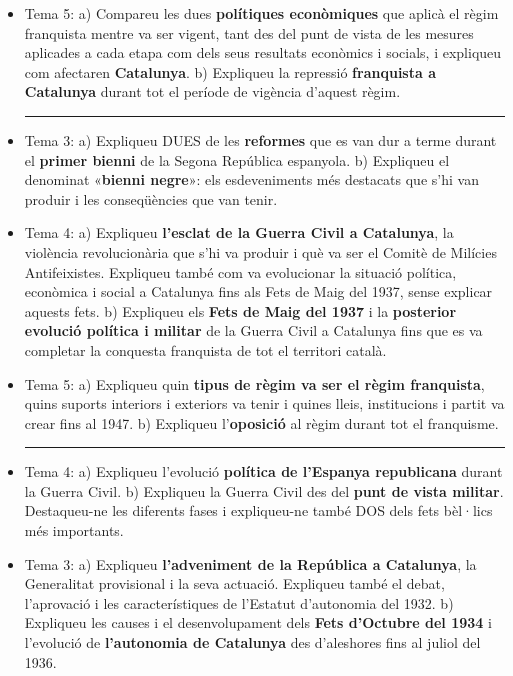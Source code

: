 \documentclass[arial,a4paper,print]{article}
\begin{document}
\begin{itemize}
\item Tema 5:
\subitem a) Compareu les dues \textbf{polítiques econòmiques} que aplicà el règim franquista mentre va ser vigent, tant des del punt de vista de les mesures aplicades a cada etapa com dels seus resultats econòmics i socials, i expliqueu com afectaren \textbf{Catalunya}. 
\subitem b) Expliqueu la repressió \textbf{franquista a Catalunya} durant tot el període de vigència d’aquest règim.

\noindent\rule{\linewidth}{0.4pt}

\item Tema 3: 
\subitem a) Expliqueu  DUES  de  les  \textbf{reformes}  que  es  van  dur  a  terme  durant  el  \textbf{primer  bienni}  de  la  Segona República espanyola.
\subitem b) Expliqueu  el  denominat  «\textbf{bienni  negre}»:  els  esdeveniments  més  destacats  que  s’hi  van  produir i les conseqüències que van tenir.

\item Tema 4:
\subitem a) Expliqueu  \textbf{l’esclat  de  la  Guerra  Civil  a  Catalunya},  la  violència  revolucionària  que  s’hi  va  produir i què va ser el Comitè de Milícies Antifeixistes. Expliqueu també com va evolucionar la situació política, econòmica i social a Catalunya fins als Fets de Maig del 1937, sense explicar aquests fets.
\subitem b) Expliqueu els \textbf{Fets de Maig del 1937} i la \textbf{posterior evolució política i militar} de la Guerra Civil a Catalunya fins que es va completar la conquesta franquista de tot el territori català.

\item Tema 5:
\subitem a) Expliqueu  quin  \textbf{tipus  de  règim  va  ser  el  règim  franquista},  quins  suports  interiors  i  exteriors va tenir i quines lleis, institucions i partit va crear fins al 1947.
\subitem b) Expliqueu l’\textbf{oposició} al règim durant tot el franquisme. 

\noindent\rule{\linewidth}{0.4pt}

\item Tema 4:
\subitem a) Expliqueu l’evolució \textbf{política de l’Espanya republicana} durant la Guerra Civil.
\subitem b) Expliqueu la Guerra Civil des del \textbf{punt de vista militar}. Destaqueu-ne les diferents fases i expliqueu-ne també DOS dels fets bèl·lics més importants.

\item Tema 3:
\subitem a) Expliqueu  \textbf{l’adveniment  de  la  República  a  Catalunya},  la  Generalitat  provisional  i  la  seva  actuació.  Expliqueu  també  el  debat,  l’aprovació  i  les  característiques  de  l’Estatut  d’autonomia del 1932.
\subitem b) Expliqueu  les  causes  i  el  desenvolupament  dels \textbf{ Fets  d’Octubre  del  1934}  i  l’evolució  de  \textbf{l’autonomia de Catalunya} des d’aleshores fins al juliol del 1936.


\end{itemize}
\end{document}
